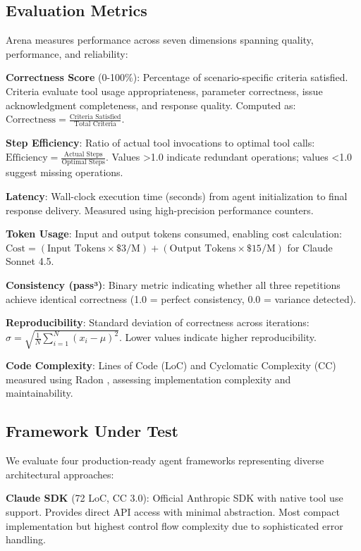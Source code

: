 \documentclass[sigconf,nonacm]{acmart}
\begin{document}
\subsection{Evaluation Metrics}

Arena measures performance across seven dimensions spanning quality, performance, and reliability:

\textbf{Correctness Score} (0-100\%): Percentage of scenario-specific criteria satisfied. Criteria evaluate tool usage appropriateness, parameter correctness, issue acknowledgment completeness, and response quality. Computed as: $\text{Correctness} = \frac{\text{Criteria Satisfied}}{\text{Total Criteria}}$.

\textbf{Step Efficiency}: Ratio of actual tool invocations to optimal tool calls: $\text{Efficiency} = \frac{\text{Actual Steps}}{\text{Optimal Steps}}$. Values >1.0 indicate redundant operations; values <1.0 suggest missing operations.

\textbf{Latency}: Wall-clock execution time (seconds) from agent initialization to final response delivery. Measured using high-precision performance counters.

\textbf{Token Usage}: Input and output tokens consumed, enabling cost calculation: $\text{Cost} = (\text{Input Tokens} \times \$3/\text{M}) + (\text{Output Tokens} \times \$15/\text{M})$ for Claude Sonnet 4.5.

\textbf{Consistency (pass³)}: Binary metric indicating whether all three repetitions achieve identical correctness (1.0 = perfect consistency, 0.0 = variance detected).

\textbf{Reproducibility}: Standard deviation of correctness across iterations: $\sigma = \sqrt{\frac{1}{N}\sum_{i=1}^{N}(x_i - \mu)^2}$. Lower values indicate higher reproducibility.

\textbf{Code Complexity}: Lines of Code (LoC) and Cyclomatic Complexity (CC) measured using Radon \cite{radon2023}, assessing implementation complexity and maintainability.

\subsection{Framework Under Test}

We evaluate four production-ready agent frameworks representing diverse architectural approaches:

\textbf{Claude SDK} (72 LoC, CC 3.0): Official Anthropic SDK with native tool use support. Provides direct API access with minimal abstraction. Most compact implementation but highest control flow complexity due to sophisticated error handling.
\end{document}
